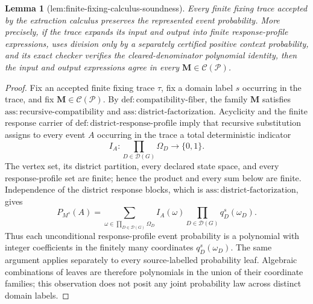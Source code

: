 \documentclass{article}
\newtheorem{lemma}{Lemma}
\begin{document}
\begin{lemma}[lem:finite-fixing-calculus-soundness]\label{lem:finite-fixing-calculus-soundness}
Every finite fixing trace accepted by the extraction calculus preserves the represented event probability.  More precisely, if the trace expands its input and output into finite response-profile expressions, uses division only by a separately certified positive context probability, and its exact checker verifies the cleared-denominator polynomial identity, then the input and output expressions agree in every \(\mathbf M\in\mathcal C(\mathcal P)\).
\end{lemma}
\begin{proof}
Fix an accepted finite fixing trace \(\tau\), fix a domain label \(s\) occurring in the trace, and fix \(\mathbf M\in\mathcal C(\mathcal P)\). By \(\mathrm{def:compatibility\text{-}fiber}\), the family \(\mathbf M\) satisfies \(\mathrm{ass:recursive\text{-}compatibility}\) and \(\mathrm{ass:district\text{-}factorization}\). Acyclicity and the finite response carrier of \(\mathrm{def:district\text{-}response\text{-}profile}\) imply that recursive substitution assigns to every event \(A\) occurring in the trace a total deterministic indicator
\[
 I_A:\prod_{D\in\mathcal D(G)}\Omega_D\longrightarrow\{0,1\}.
\tag{1}
\]
The vertex set, its district partition, every declared state space, and every response-profile set are finite; hence the product and every sum below are finite. Independence of the district response blocks, which is \(\mathrm{ass:district\text{-}factorization}\), gives
\[
 P_{M^s}(A)
 =\sum_{\omega\in\prod_{D\in\mathcal D(G)}\Omega_D}
 I_A(\omega)\prod_{D\in\mathcal D(G)}q_D^s(\omega_D).
\tag{2}
\]
Thus each unconditional response-profile event probability is a polynomial with integer coefficients in the finitely many coordinates \(q_D^s(\omega_D)\). The same argument applies separately to every source-labelled probability leaf. Algebraic combinations of leaves are therefore polynomials in the union of their coordinate families; this observation does not posit any joint probability law across distinct domain labels.


\end{proof}
\end{document}
